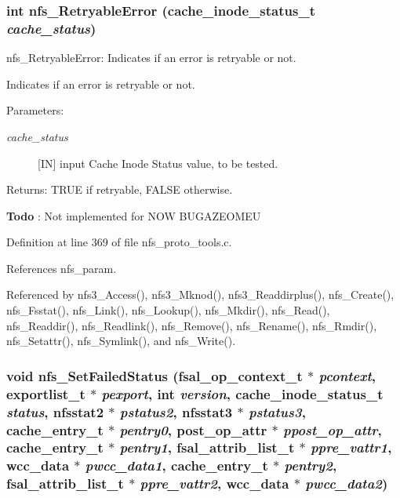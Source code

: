 \subsubsection{\setlength{\rightskip}{0pt plus 5cm}int nfs\_\-Retryable\-Error (cache\_\-inode\_\-status\_\-t {\em cache\_\-status})}\label{nfs__proto__tools_8c_a5}


nfs\_\-Retryable\-Error: Indicates if an error is retryable or not.

Indicates if an error is retryable or not.

\begin{Desc}
\item[Parameters:]
\begin{description}
\item[{\em cache\_\-status}][IN] input Cache Inode Status value, to be tested.\end{description}
\end{Desc}
\begin{Desc}
\item[Returns:]TRUE if retryable, FALSE otherwise.\end{Desc}


\begin{Desc}
\item[{\bf Todo}]: Not implemented for NOW BUGAZEOMEU \end{Desc}


Definition at line 369 of file nfs\_\-proto\_\-tools.c.

References nfs\_\-param.

Referenced by nfs3\_\-Access(), nfs3\_\-Mknod(), nfs3\_\-Readdirplus(), nfs\_\-Create(), nfs\_\-Fsstat(), nfs\_\-Link(), nfs\_\-Lookup(), nfs\_\-Mkdir(), nfs\_\-Read(), nfs\_\-Readdir(), nfs\_\-Readlink(), nfs\_\-Remove(), nfs\_\-Rename(), nfs\_\-Rmdir(), nfs\_\-Setattr(), nfs\_\-Symlink(), and nfs\_\-Write().
\subsubsection{\setlength{\rightskip}{0pt plus 5cm}void nfs\_\-Set\-Failed\-Status (fsal\_\-op\_\-context\_\-t $\ast$ {\em pcontext}, exportlist\_\-t $\ast$ {\em pexport}, int {\em version}, cache\_\-inode\_\-status\_\-t {\em status}, nfsstat2 $\ast$ {\em pstatus2}, nfsstat3 $\ast$ {\em pstatus3}, cache\_\-entry\_\-t $\ast$ {\em pentry0}, post\_\-op\_\-attr $\ast$ {\em ppost\_\-op\_\-attr}, cache\_\-entry\_\-t $\ast$ {\em pentry1}, fsal\_\-attrib\_\-list\_\-t $\ast$ {\em ppre\_\-vattr1}, wcc\_\-data $\ast$ {\em pwcc\_\-data1}, cache\_\-entry\_\-t $\ast$ {\em pentry2}, fsal\_\-attrib\_\-list\_\-t $\ast$ {\em ppre\_\-vattr2}, wcc\_\-data $\ast$ {\em pwcc\_\-data2})}\label{nfs__proto__tools_8c_a6}




